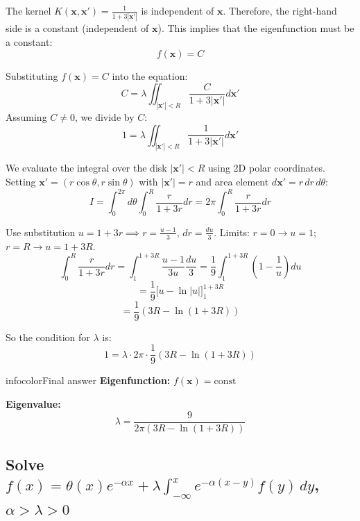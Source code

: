 \documentclass[a4paper,11pt]{article} %
\newenvironment{summarybox}[1][]{\begin{custombox}[#1]{infocolor}{Final answer}}{\end{custombox}}
\begin{document}
The kernel $K(\mathbf{x}, \mathbf{x}') = \frac{1}{1+3|\mathbf{x}'|}$ is independent of $\mathbf{x}$. Therefore, the right-hand side is a constant (independent of $\mathbf{x}$).
This implies that the eigenfunction must be a constant:
$$ f(\mathbf{x}) = C $$

Substituting $f(\mathbf{x}) = C$ into the equation:
$$ C = \lambda \iint_{|\mathbf{x}'|<R} \frac{C}{1+3|\mathbf{x}'|} d\mathbf{x}' $$
Assuming $C \neq 0$, we divide by $C$:
$$ 1 = \lambda \iint_{|\mathbf{x}'|<R} \frac{1}{1+3|\mathbf{x}'|} d\mathbf{x}' $$

We evaluate the integral over the disk $|\mathbf{x}'|<R$ using 2D polar coordinates. Setting $\mathbf{x}' = (r\cos\theta, r\sin\theta)$ with $|\mathbf{x}'| = r$ and area element $d\mathbf{x}' = r\, dr\, d\theta$:
$$ I = \int_0^{2\pi} d\theta \int_0^R \frac{r}{1+3r} dr = 2\pi \int_0^R \frac{r}{1+3r} dr $$

Use substitution $u = 1+3r \implies r = \frac{u-1}{3}, \, dr = \frac{du}{3}$.
Limits: $r=0 \to u=1$; $r=R \to u=1+3R$.
$$ \int_0^R \frac{r}{1+3r} dr = \int_1^{1+3R} \frac{u-1}{3u} \frac{du}{3} = \frac{1}{9} \int_1^{1+3R} \left(1 - \frac{1}{u}\right) du $$
$$ = \frac{1}{9} \Big[ u - \ln|u| \Big]_1^{1+3R} $$
$$ = \frac{1}{9} (3R - \ln(1+3R)) $$

So the condition for $\lambda$ is:
$$ 1 = \lambda \cdot 2\pi \cdot \frac{1}{9} (3R - \ln(1+3R)) $$

\begin{summarybox}
\textbf{Eigenfunction:} $f(\mathbf{x}) = \text{const}$

\textbf{Eigenvalue:}
$$ \lambda = \frac{9}{2\pi (3R - \ln(1+3R))} $$
\end{summarybox}

\newpage


\newpage

\subsection{\texorpdfstring{Solve $f(x)=\theta(x)e^{-\alpha x}+\lambda\int_{-\infty}^{x}e^{-\alpha(x-y)}f(y)\,dy$, $\alpha>\lambda>0$}{Volterra convolution IE: multiply by $e^{\alpha x}$, differentiate to get $f'+( \alpha-\lambda)f=\delta(x)$}}
\end{document}
